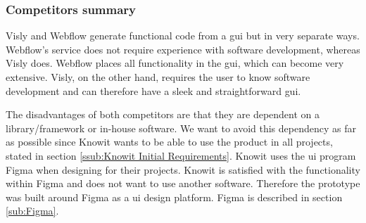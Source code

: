 


\subsubsection{Competitors summary}%
\label{ssub:Comparison}
Visly and Webflow generate functional code from a \acrfull{gui} but in very separate ways. Webflow's service does not require experience with software development, whereas Visly does. Webflow places all functionality in the \acrshort{gui}, which can become very extensive. Visly, on the other hand, requires the user to know software development and can therefore have a sleek and straightforward \acrshort{gui}.

The disadvantages of both competitors are that they are dependent on a library/framework or in-house software. We want to avoid this dependency as far as possible since Knowit wants to be able to use the product in all projects, stated in section \ref{ssub:Knowit Initial Requirements}. Knowit uses the \acrshort{ui} program Figma when designing  for their projects. Knowit is satisfied with the functionality within Figma and does not want to use another software. Therefore the prototype was built around Figma as a \acrshort{ui} design platform. Figma is described in section \ref{sub:Figma}.



